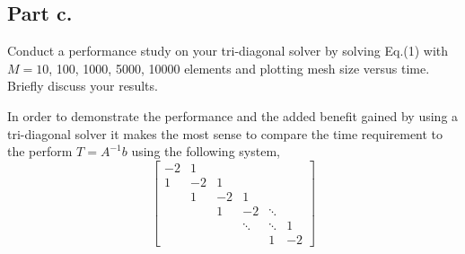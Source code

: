\subsection{Part c.}
Conduct a performance study on your tri-diagonal solver by solving Eq.(1)
with $M=10$, 100, 1000, 5000, 10000 elements and plotting mesh size versus
time. Briefly discuss your results.
\begin{mdframed}[style=MyFrame]
    In order to demonstrate the performance and the added benefit gained by
    using a tri-diagonal solver it makes the most sense to compare the time
    requirement to the perform $T=A^{-1}b$ using the following system,   
    \begin{equation}
        \begin{bmatrix}
            -2      & 1         &           &           &               &         \\  
            1       & -2        &   1       &           &               &         \\  
                    & 1         &   -2      &  1        &               &         \\  
                    &           &   1       &  -2       & \ddots        &         \\  
                    &           &           &  \ddots   & \ddots        & 1       \\  
                    &           &           &           & 1             & -2        


\end{bmatrix}
\end{equation}
\end{mdframed}
